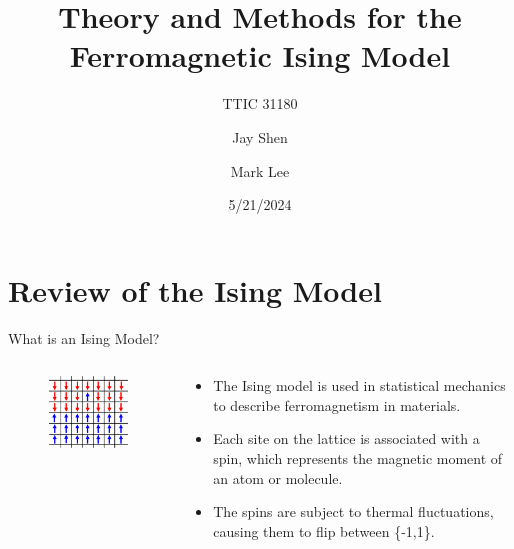 \documentclass{minesbeamer}
\title{Theory and Methods for the Ferromagnetic Ising Model}
\subtitle{TTIC 31180}
\author[Jay Shen \and Mark Lee]{Jay Shen \and Mark Lee}
\date{5/21/2024} %
\begin{document}
\maketitle

\cutoc

\section{Review of the Ising Model}

\begin{frame}{What is an Ising Model?}
    \begin{columns}
        \begin{column}{0.6\textwidth}
            \begin{figure}
                \centering
                \includegraphics[height=0.7\textheight]{monte-carlo-ising-2.png}
            \end{figure}
        \end{column}
        \begin{column}{0.5\textwidth}
            \begin{itemize}
                \item The Ising model is used in statistical mechanics to describe ferromagnetism in materials.
                \item Each site on the lattice is associated with a spin, which represents the magnetic moment of an atom or molecule.
                \item The spins are subject to thermal fluctuations, causing them to flip between \{-1,1\}.
            \end{itemize}
        \end{column}
    \end{columns}
\end{frame}
\end{document}
